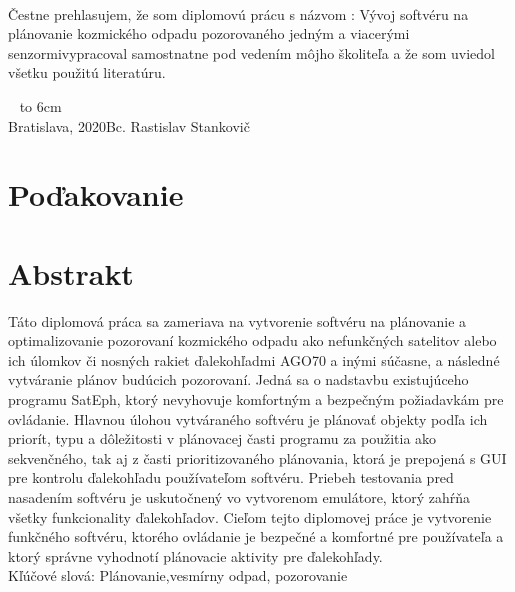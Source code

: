 \documentclass[12pt, a4paper, oneside]{book}
\newcommand\mftitle{Vývoj softvéru na plánovanie kozmického odpadu pozorovaného jedným a viacerými senzormi}
\newcommand\mfauthor{Bc. Rastislav Stankovič}
\newcommand\mfplacedate{Bratislava, 2020}
\begin{document}

{~}\vspace{12cm}

\noindent
Čestne prehlasujem, že som diplomovú prácu s názvom : \mftitle vypracoval samostnatne pod vedením môjho školiteľa a že som uviedol všetku použitú literatúru.
\newline \newline

\vfill
~ \hfill {\hbox to 6cm{\dotfill}} \\
\mfplacedate \hfill \mfauthor
\vfill\eject 

\chapter*{Poďakovanie}\label{chap:thank_you}

\vfill\eject 

\chapter*{Abstrakt}\label{chap:abstract_sk}
Táto diplomová práca sa zameriava na vytvorenie softvéru na plánovanie a optimalizovanie pozorovaní kozmického odpadu ako nefunkčných satelitov alebo ich úlomkov či nosných rakiet ďalekohľadmi AGO70 a inými súčasne, a následné vytváranie plánov budúcich pozorovaní. Jedná sa o nadstavbu existujúceho programu SatEph, ktorý nevyhovuje komfortným a bezpečným požiadavkám pre ovládanie. Hlavnou úlohou vytváraného softvéru je plánovať objekty podľa ich priorít, typu a dôležitosti v plánovacej časti programu za použitia ako sekvenčného, tak aj z časti prioritizovaného plánovania, ktorá je prepojená s GUI pre kontrolu ďalekohľadu používateľom softvéru. Priebeh testovania pred nasadením softvéru je uskutočnený vo vytvorenom emulátore, ktorý zahŕňa všetky funkcionality ďalekohľadov. Cieľom tejto diplomovej práce je vytvorenie funkčného softvéru, ktorého ovládanie je bezpečné a komfortné pre používateľa a ktorý správne vyhodnotí plánovacie aktivity pre ďalekohľady. 
~\\
Kľúčové slová: Plánovanie,vesmírny odpad, pozorovanie
\vfill\eject 
\end{document}
